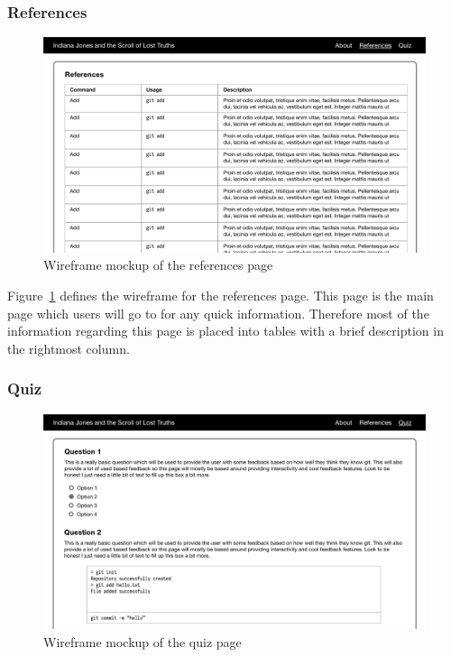 \subsubsection{References}
\begin{figure}
	\centering
	\includegraphics[width=0.9\linewidth]{wireframe/web5}
	\caption{Wireframe mockup of the references page}\label{fig:wreferences}	
\end{figure}

Figure~\ref{fig:wreferences} defines the wireframe for the references page. This page is the main page which users will go to for any quick information. Therefore most of the information regarding this page is placed into tables with a brief description in the rightmost column.

\subsubsection{Quiz}
\begin{figure}
	\centering
	\includegraphics[width=0.9\linewidth]{wireframe/web6}
	\caption{Wireframe mockup of the quiz page}\label{fig:wquiz}	
\end{figure}

